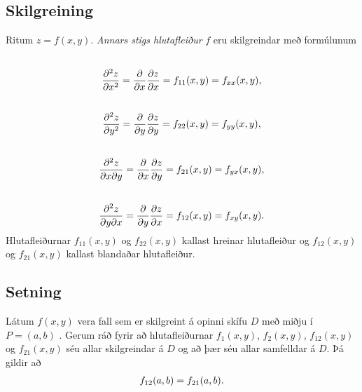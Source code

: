 \documentclass[a4paper,10pt,icelandic]{sphinxmanual}
\begin{document}
\subsection{Skilgreining}
\label{Kafli2:id13}\label{Kafli2:index-10}
Ritum \(z=f(x,y)\). \emph{Annars stigs hlutafleiður} \(f\) eru
skilgreindar með formúlunum
\begin{gather}
\begin{split}\displaystyle\end{split}\notag\\\begin{split}\frac{\partial^2 z}{\partial x^2}=
\frac{\partial}{\partial x} \frac{\partial z}{\partial x}
=f_{11}(x,y)=f_{xx}(x,y),\end{split}\notag
\end{gather}\begin{gather}
\begin{split}\displaystyle\end{split}\notag\\\begin{split}\frac{\partial^2 z}{\partial y^2}=
\frac{\partial}{\partial y} \frac{\partial z}{\partial y}
=f_{22}(x,y)=f_{yy}(x,y),\end{split}\notag
\end{gather}\begin{gather}
\begin{split}\displaystyle\end{split}\notag\\\begin{split}\frac{\partial^2 z}{\partial x\partial y}=
\frac{\partial}{\partial x} \frac{\partial z}{\partial y}
=f_{21}(x,y)=f_{yx}(x,y),\end{split}\notag
\end{gather}\begin{gather}
\begin{split}\displaystyle\end{split}\notag\\\begin{split}\frac{\partial^2 z}{\partial y\partial x}=
\frac{\partial}{\partial y} \frac{\partial z}{\partial x}
=f_{12}(x,y)=f_{xy}(x,y).\end{split}\notag
\end{gather}
Hlutafleiðurnar \(f_{11}(x,y)\) og \(f_{22}(x,y)\) kallast
hreinar hlutafleiður og \(f_{12}(x,y)\) og \(f_{21}(x,y)\)
kallast blandaðar hlutafleiður.


\subsection{Setning}
\label{Kafli2:id14}
Látum \(f(x,y)\) vera fall sem er skilgreint á opinni skífu
\(D\) með miðju í \(P=(a,b)\) . Gerum ráð fyrir að
hlutafleiðurnar \(f_1(x,y)\), \(f_2(x,y)\), \(f_{12}(x,y)\)
og \(f_{21}(x,y)\) séu allar skilgreindar á \(D\) og að þær séu
allar samfelldar á \(D\). Þá gildir að
\begin{gather}
\begin{split}\displaystyle f_{12}(a,b)=f_{21}(a,b).\end{split}\notag
\end{gather}
\end{document}
